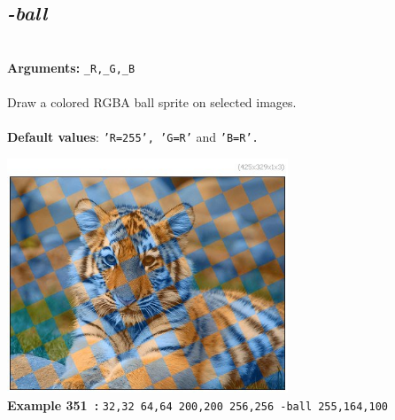 \documentclass[a4paper,11pt,twoside]{book}
\begin{document}
\subsection{\emph{-ball} }\vspace*{-0.5em}
~\\\textbf{Arguments: } 
{\small \texttt{\_R,\_G,\_B}}\\~\\
Draw a colored RGBA ball sprite on selected images.
~\\~\\\textbf{Default values}: {\small \texttt{'R=255', 'G=R'} and \texttt{'B=R'.}}
\begin{center}\includegraphics[keepaspectratio=true,height=7cm,width=\textwidth]{img/gmic_def351.jpg}\\
{\footnotesize \textbf{Example 351~:} \texttt{32,32 64,64 200,200 256,256 -ball 255,164,100}}
\end{center}
\end{document}
